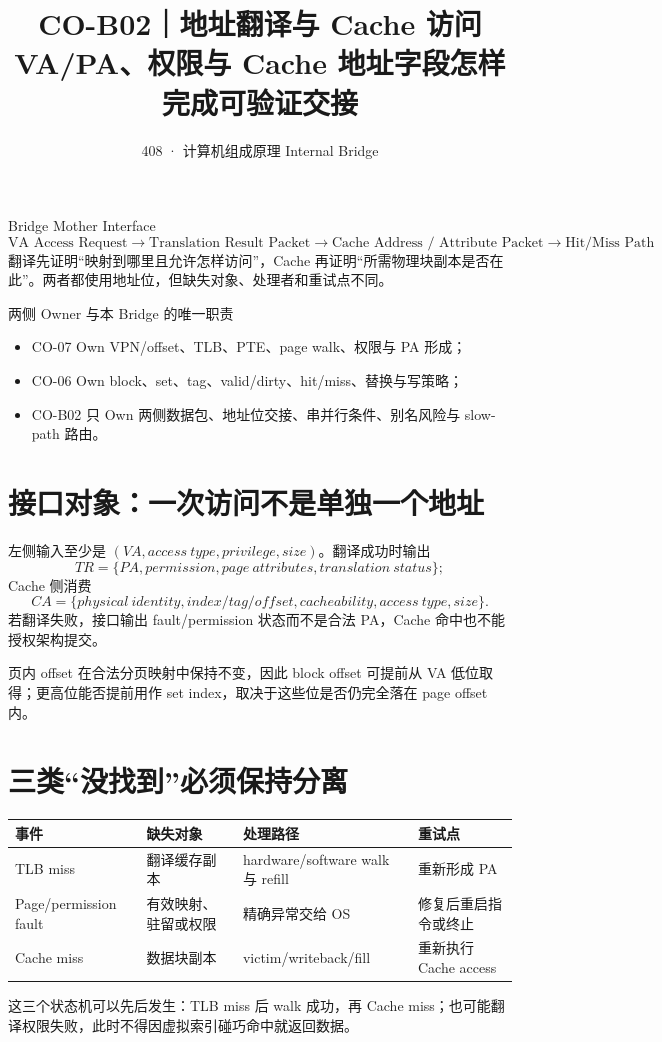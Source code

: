 \documentclass[UTF8,fontset=fandol,11pt,a4paper]{ctexart}
\title{\vspace{-1.1cm}\textbf{CO-B02｜地址翻译与 Cache 访问}\\[0.4em]\large VA/PA、权限与 Cache 地址字段怎样完成可验证交接}
\author{408 · 计算机组成原理 Internal Bridge}
\date{}
\begin{document}
\maketitle

\begin{corebox}{Bridge Mother Interface}
\[
\boxed{\text{VA Access Request}\to\text{Translation Result Packet}\to\text{Cache Address / Attribute Packet}\to\text{Hit/Miss Path}}
\]
翻译先证明“映射到哪里且允许怎样访问”，Cache 再证明“所需物理块副本是否在此”。两者都使用地址位，但缺失对象、处理者和重试点不同。
\end{corebox}

\begin{methodbox}{两侧 Owner 与本 Bridge 的唯一职责}
\begin{itemize}
\item CO-07 Own VPN/offset、TLB、PTE、page walk、权限与 PA 形成；
\item CO-06 Own block、set、tag、valid/dirty、hit/miss、替换与写策略；
\item CO-B02 只 Own 两侧数据包、地址位交接、串并行条件、别名风险与 slow-path 路由。
\end{itemize}
\end{methodbox}

\tableofcontents
\newpage

\section{接口对象：一次访问不是单独一个地址}
左侧输入至少是 $(VA,access\ type,privilege,size)$。翻译成功时输出
\[
TR=\{PA,permission,page\ attributes,translation\ status\};
\]
Cache 侧消费
\[
CA=\{physical\ identity,index/tag/offset,cacheability,access\ type,size\}.
\]
若翻译失败，接口输出 fault/permission 状态而不是合法 PA，Cache 命中也不能授权架构提交。

页内 offset 在合法分页映射中保持不变，因此 block offset 可提前从 VA 低位取得；更高位能否提前用作 set index，取决于这些位是否仍完全落在 page offset 内。

\section{三类“没找到”必须保持分离}
\begin{center}\small
\begin{tabularx}{\linewidth}{L{2.2cm}YYY}\toprule
事件 & 缺失对象 & 处理路径 & 重试点\\\midrule
TLB miss & 翻译缓存副本 & hardware/software walk 与 refill & 重新形成 PA\\
Page/permission fault & 有效映射、驻留或权限 & 精确异常交给 OS & 修复后重启指令或终止\\
Cache miss & 数据块副本 & victim/writeback/fill & 重新执行 Cache access\\
\bottomrule
\end{tabularx}
\end{center}
这三个状态机可以先后发生：TLB miss 后 walk 成功，再 Cache miss；也可能翻译权限失败，此时不得因虚拟索引碰巧命中就返回数据。
\end{document}
